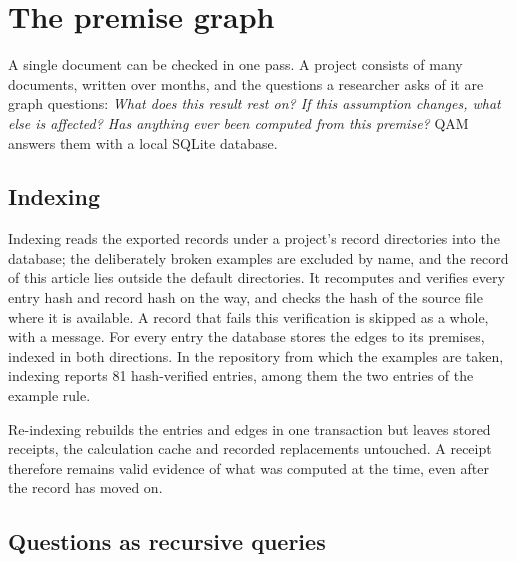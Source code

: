 \section{The premise graph}\label{sec:graph}

A single document can be checked in one pass. A project consists of many documents, written over months, and the questions a researcher
asks of it are graph questions: \emph{What does this result rest on? If this assumption changes, what else is affected? Has anything
ever been computed from this premise?} QAM answers them with a local SQLite database.

\subsection{Indexing}

Indexing reads the exported records under a project's record directories into the database; the deliberately broken examples are excluded by name, and the record of this article lies outside the default directories. It recomputes and verifies every entry hash and record hash on the
way, and checks the hash of the source file where it is available. A record that fails this verification is skipped as a whole, with a message. For every entry
the database stores the edges to its premises, indexed in both directions. In the repository from which the examples are taken, indexing reports 81
hash-verified entries, among them the two entries of the example rule.

Re-indexing rebuilds the entries and edges in one transaction but leaves stored receipts, the calculation cache and recorded replacements
untouched. A receipt therefore remains valid evidence of what was computed at the time, even after the record has moved on.

\subsection{Questions as recursive queries}

